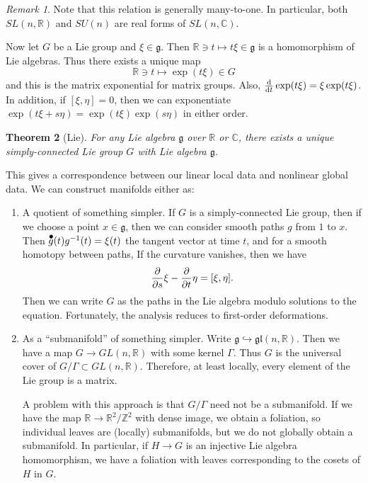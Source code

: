 \documentclass[leqno, openany]{memoir}
\newtheorem{thm}{Theorem}[section]
\theoremstyle{definition}
\theoremstyle{remark}
\newtheorem{rmk}[thm]{Remark}
\theoremstyle{plain}
\theoremstyle{definition}
\theoremstyle{remark}
\newcommand{\R}{\mathbb{R}}
\newcommand{\C}{\mathbb{C}}
\newcommand{\Z}{\mathbb{Z}}
\newcommand*{\dt}[1]{%
   \accentset{\mbox{\Huge\bfseries .}}{#1}}
\newcommand{\mf}[1]{\mathfrak{#1}}
\begin{document}
\begin{rmk}
    Note that this relation is generally many-to-one. In particular, both $SL(n, \R)$ and $SU(n)$ are real forms of $SL(n, \C)$.
\end{rmk}

Now let $G$ be a Lie group and $\xi \in \mf{g}$. Then $\R \ni t \mapsto t \xi \in \mf{g}$ is a homomorphism of Lie algebras. Thus there exists a unique map
\[ \R \ni t \mapsto \exp(t \xi) \in G \]
and this is the matrix exponential for matrix groups. Also, $\dv{t} \exp(t \xi) = \xi \exp(t \xi)$. In addition, if $[\xi, \eta] = 0$, then we can exponentiate $\exp(t \xi + s \eta) = \exp(t \xi) \exp(s \eta)$ in either order.

\begin{thm}[Lie]
    For any Lie algebra $\mf{g}$ over $\R$ or $\C$, there exists a unique simply-connected Lie group $G$ with Lie algebra $\mf{g}$.
\end{thm}

This gives a correspondence between our linear local data and nonlinear global data. We can construct manifolds either as:
\begin{enumerate}
    \item A quotient of something simpler. If $G$ is a simply-connected Lie group, then if we choose a point $x \in \mf{g}$, then we can consider smooth paths $g$ from $1$ to $x$. Then $\dt{g}(t) g^{-1}(t) = \xi(t)$ the tangent vector at time $t$, and for a smooth homotopy between paths, If the curvature vanishes, then we have
        \[ \pdv{s} \xi - \pdv{t} \eta = [\xi, \eta]. \]
        Then we can write $G$ as the paths in the Lie algebra modulo solutions to the equation. Fortunately, the analysis reduces to first-order deformations.
    \item As a ``submanifold'' of something simpler. Write $\mf{g} \hookrightarrow \mf{gl}(n, \R)$. Then we have a map $G \to GL(n, \R)$ with some kernel $\Gamma$. Thus $G$ is the universal cover of $G/\Gamma \subset GL(n, \R)$. Therefore, at least locally, every element of the Lie group is a matrix.

        A problem with this approach is that $G/\Gamma$ need not be a submanifold. If we have the map $\R \to \R^2 / \Z^2$ with dense image, we obtain a foliation, so individual leaves are (locally) submanifolds, but we do not globally obtain a submanifold. In particular, if $H \to G$ is an injective Lie algebra homomorphism, we have a foliation with leaves corresponding to the cosets of $H$ in $G$.
\end{enumerate}
\end{document}
